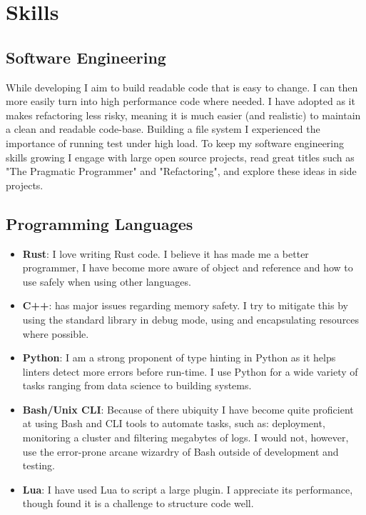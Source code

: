 \section{Skills}
\subsection{Software Engineering}
While developing I aim to build readable code that is easy to change. I can then more easily turn into high performance code where needed. I have adopted  as it makes refactoring less risky, meaning it is much easier (and realistic) to maintain a clean and readable code-base. Building a  file system I experienced the importance of running test under high load. To keep my software engineering skills growing I engage with large open source projects, read great titles such as "The Pragmatic Programmer" and "Refactoring", and explore these ideas in side projects.

\subsection{Programming Languages}
\begin{itemize}
	\item \textbf{Rust}: I love writing Rust code. I believe it has made me a better programmer, I have become more aware of object and reference  and how to use  safely when using other languages. 
	\item \textbf{C++}: has major issues regarding memory safety. I try to mitigate this by using the standard library in debug mode, using  and encapsulating resources where possible. 
	\item \textbf{Python}: I am a strong proponent of type hinting in Python as it helps linters detect more errors before run-time. I use Python for a wide variety of tasks ranging from data science to building  systems.
	\item \textbf{Bash/Unix CLI}: Because of there ubiquity I have become quite proficient at using Bash and CLI tools to automate  tasks, such as: deployment, monitoring a cluster and filtering megabytes of logs. I would not, however, use the error-prone arcane wizardry of Bash outside of development and testing.
	\item \textbf{Lua}: I have used Lua to script a large  plugin. I appreciate its performance, though found it is a challenge to structure code well.
\end{itemize}


